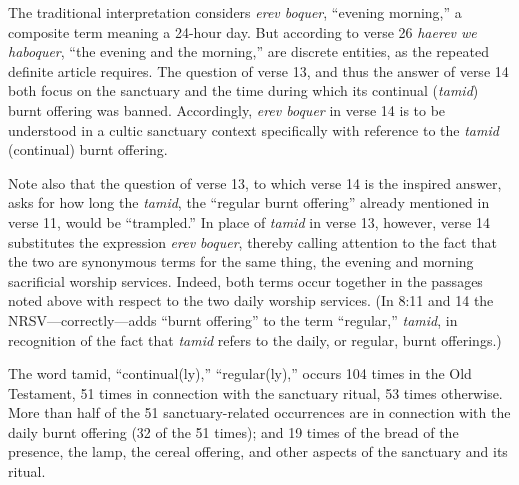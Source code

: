 The traditional interpretation considers \textit{erev boquer}, ``evening morning,'' a
composite term meaning a 24-hour day. But according to verse 26 \textit{haerev we
haboquer}, ``the evening and the morning,'' are discrete entities, as the
repeated definite article requires. The question of verse 13, and thus the
answer of verse 14 both focus on the sanctuary and the time during which its
continual (\textit{tamid}) burnt offering was banned. Accordingly, \textit{erev boquer} in
verse 14 is to be understood in a cultic sanctuary context specifically with
reference to the \textit{tamid} (continual) burnt offering.

Note also that the question of verse 13, to which verse 14 is the inspired
answer, asks for how long the \textit{tamid}, the ``regular burnt offering'' already
mentioned in verse 11, would be ``trampled.'' In place of \textit{tamid} in verse 13, 
however, verse 14 substitutes the expression \textit{erev boquer}, thereby calling
attention to the fact that the two are synonymous terms for the same thing,
the evening and morning sacrificial worship services. Indeed, both terms
occur together in the passages noted above with respect to the two daily
worship services. (In 8:11 and 14 the NRSV---correctly---adds
``burnt offering'' to the term ``regular,'' \textit{tamid}, in recognition of the fact
that \textit{tamid} refers to the daily, or regular, burnt offerings.)

The word tamid, ``continual(ly),'' ``regular(ly),'' occurs 104 times in the Old
Testament, 51 times in connection with the sanctuary ritual, 53 times
otherwise. More than half of the 51 sanctuary-related occurrences are in
connection with the daily burnt offering (32 of the 51 times); and 19 times
of the bread of the presence, the lamp, the cereal offering, and other
aspects of the sanctuary and its ritual. 

